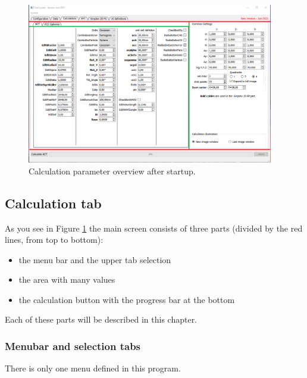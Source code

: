 \documentclass[11pt]{article} %
\begin{document}
\begin{figure}[H]
 \centering
 \includegraphics[width=0.96\textwidth]{main-calc-start-lines.png}
 \caption{Calculation parameter overview after startup.}
 \label{fig:calcstart}
\end{figure}


\subsection{Calculation tab}

As you see in Figure \ref{fig:calcstart} the main screen consists of three parts (divided by the red lines, from top to bottom):
\begin{itemize}\itemsep0pt
\item the menu bar and the upper tab selection
\item the area with many values
\item the calculation button with the progress bar at the bottom
\end{itemize}
Each of these parts will be described in this chapter.

\subsubsection{Menubar and selection tabs}

There is only one menu defined in this program.
\end{document}
